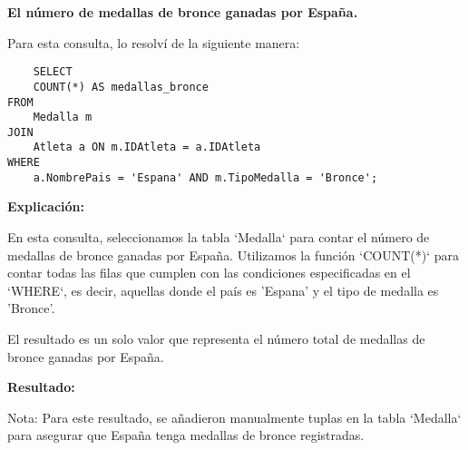 \textbf{El número de medallas de bronce ganadas por España.}\vspace{.3cm}

Para esta consulta, lo resolví de la siguiente manera: \vspace{.3cm}

\begin{lstlisting}
    SELECT 
    COUNT(*) AS medallas_bronce
FROM 
    Medalla m
JOIN 
    Atleta a ON m.IDAtleta = a.IDAtleta
WHERE 
    a.NombrePais = 'Espana' AND m.TipoMedalla = 'Bronce';
\end{lstlisting}

\textbf{Explicación:} \vspace{.3cm}

En esta consulta, seleccionamos la tabla `Medalla` para contar el número de medallas de bronce ganadas por España. Utilizamos la función `COUNT(*)` para contar todas las filas que cumplen con las condiciones especificadas en el `WHERE`, es decir, aquellas donde el país es 'Espana' y el tipo de medalla es 'Bronce'. \vspace{.3cm}

El resultado es un solo valor que representa el número total de medallas de bronce ganadas por España. \vspace{.3cm}

\textbf{Resultado:}
\begin{center}
    
\end{center}   

Nota: Para este resultado, se añadieron manualmente tuplas en la tabla `Medalla` para asegurar que España tenga medallas de bronce registradas. \vspace{.3cm}